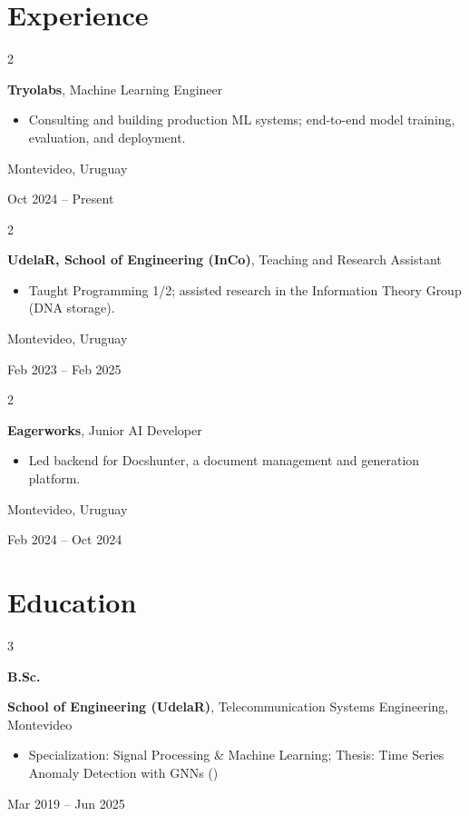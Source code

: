 \documentclass[10pt, letterpaper]{article}
\newenvironment{highlights}{
    \begin{itemize}[
        topsep=0.10 cm,
        parsep=0.10 cm,
        partopsep=0pt,
        itemsep=0pt,
        leftmargin=0.4 cm + 10pt
    ]
}{
    \end{itemize}
} %
\newenvironment{twocolentry}[2][]{
    \onecolentry
    \def\secondColumn{#2}
    \setcolumnwidth{\fill, 4.5 cm}
    \begin{paracol}{2}
}{
    \switchcolumn \raggedleft \secondColumn
    \end{paracol}
    \endonecolentry
} %
\newenvironment{threecolentry}[3][]{
    \onecolentry
    \def\thirdColumn{#3}
    \setcolumnwidth{1 cm, \fill, 4.5 cm}
    \begin{paracol}{3}
    {\raggedright #2} \switchcolumn
}{
    \switchcolumn \raggedleft \thirdColumn
    \end{paracol}
    \endonecolentry
} %
\let\hrefWithoutArrow\href
\renewcommand{\href}[2]{\hrefWithoutArrow{#1}{\ifthenelse{\equal{#2}{}}{ }{#2 }\raisebox{.15ex}{\footnotesize \faExternalLink*}}}
\begin{document}
    \section{Experience}

        \begin{twocolentry}{
            Montevideo, Uruguay

        Oct 2024 -- Present
        }
            \textbf{Tryolabs}, Machine Learning Engineer
            \begin{highlights}
                \item Consulting and building production ML systems; end-to-end model training, evaluation, and deployment.
            \end{highlights}
        \end{twocolentry}

        \vspace{0.2 cm}

        \begin{twocolentry}{
            Montevideo, Uruguay

        Feb 2023 -- Feb 2025
        }
            \textbf{UdelaR, School of Engineering (InCo)}, Teaching and Research Assistant
            \begin{highlights}
                \item Taught Programming 1/2; assisted research in the Information Theory Group (DNA storage).
            \end{highlights}
        \end{twocolentry}

        \vspace{0.2 cm}

        \begin{twocolentry}{
            Montevideo, Uruguay

        Feb 2024 -- Oct 2024
        }
            \textbf{Eagerworks}, Junior AI Developer
            \begin{highlights}
                \item Led backend for Docshunter, a document management and generation platform.
            \end{highlights}
        \end{twocolentry}

    \section{Education}

        \begin{threecolentry}{\textbf{B.Sc.}}{
            Mar 2019 -- Jun 2025
        }
            \textbf{School of Engineering (UdelaR)}, Telecommunication Systems Engineering, Montevideo
            \begin{highlights}
                \item Specialization: Signal Processing \& Machine Learning; Thesis: Time Series Anomaly Detection with GNNs (\href{https://github.com/GraGODs/GraGOD}{GraGOD})
            \end{highlights}
        \end{threecolentry}
\end{document}
